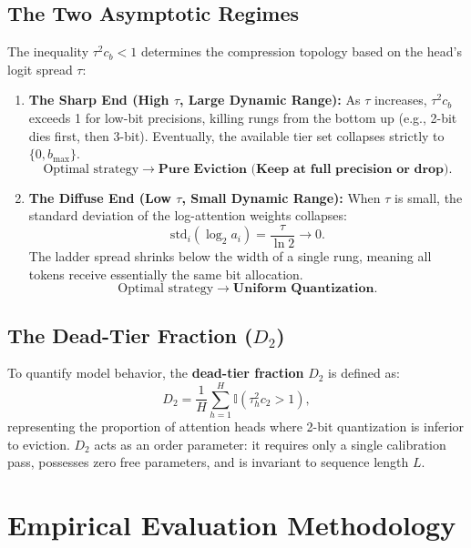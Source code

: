 \subsection{The Two Asymptotic Regimes}
The inequality $\tau^2 c_b < 1$ determines the compression topology based on the head's logit spread $\tau$:
\begin{enumerate}
    \item \textbf{The Sharp End (High $\tau$, Large Dynamic Range):}
    As $\tau$ increases, $\tau^2 c_b$ exceeds 1 for low-bit precisions, killing rungs from the bottom up (e.g., 2-bit dies first, then 3-bit). Eventually, the available tier set collapses strictly to $\{0, b_{\max}\}$.
    $$\text{Optimal strategy} \longrightarrow \textbf{Pure Eviction (Keep at full precision or drop)}.$$
    
    \item \textbf{The Diffuse End (Low $\tau$, Small Dynamic Range):}
    When $\tau$ is small, the standard deviation of the log-attention weights collapses:
    \begin{equation}
        \mathrm{std}_i(\log_2 a_i) = \frac{\tau}{\ln 2} \to 0.
    \end{equation}
    The ladder spread shrinks below the width of a single rung, meaning all tokens receive essentially the same bit allocation.
    $$\text{Optimal strategy} \longrightarrow \textbf{Uniform Quantization}.$$
\end{enumerate}

\subsection{The Dead-Tier Fraction ($D_2$)}
To quantify model behavior, the \textbf{dead-tier fraction} $D_2$ is defined as:
\begin{equation}
    D_2 = \frac{1}{H} \sum_{h=1}^H \mathbb{I}\left(\tau_h^2 c_2 > 1\right),
\end{equation}
representing the proportion of attention heads where 2-bit quantization is inferior to eviction. $D_2$ acts as an order parameter: it requires only a single calibration pass, possesses zero free parameters, and is invariant to sequence length $L$.


\section{Empirical Evaluation Methodology}

